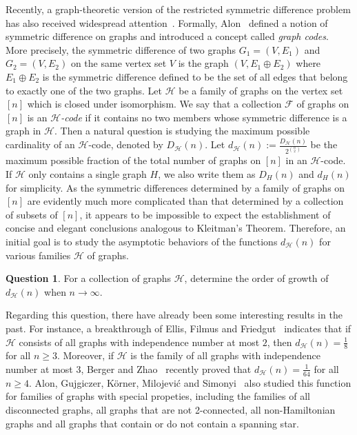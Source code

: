 \documentclass[11pt]{article}
\theoremstyle{definition}
\newtheorem{ques}[theorem]{Question}
\begin{document}
Recently, a graph-theoretic version of the restricted symmetric difference problem has also received widespread attention~\cite{2023AlonCodes,2023SIAMAlon}. Formally, Alon~\cite{2023AlonCodes} defined a notion of symmetric difference on graphs and introduced a concept called \emph{graph codes}. More precisely, the symmetric difference of two graphs $G_{1}=(V,E_{1})$ and $G_{2}=(V,E_{2})$ on the same vertex set $V$ is the graph $(V,E_{1}\oplus E_{2})$ where $E_{1}\oplus E_{2}$ is the symmetric difference defined to be the set of all edges that belong to exactly one of the two graphs. Let $\mathcal{H}$ be a family of graphs on the vertex set $[n]$ which is closed under isomorphism. We say that a collection $\mathcal{F}$ of graphs on $[n]$ is an \emph{$\mathcal{H}$-code} if
it contains no two members whose symmetric difference is a graph in $\mathcal{H}$. Then a natural question is studying the maximum possible cardinality of an $\mathcal{H}$-code, denoted by $D_{\mathcal{H}}(n)$. Let $d_{\mathcal{H}}(n):=\frac{D_{\mathcal{H}}(n)}{2^{\binom{n}{2}}}$ be the maximum possible fraction of the total number of graphs on $[n]$ in an $\mathcal{H}$-code. If $\mathcal{H}$ only contains a single graph $H$, we also write them as $D_{H}(n)$ and $d_{H}(n)$ for simplicity. As the symmetric differences determined by a family of graphs on $[n]$ are evidently much more complicated than that determined by a collection of subsets of $[n]$, it appears to be impossible to expect the establishment of concise and elegant conclusions analogous to Kleitman's Theorem. Therefore, an initial goal is to study the asymptotic behaviors of the functions $d_{\mathcal{H}}(n)$ for various families $\mathcal{H}$ of graphs.

\begin{ques}
    For a collection of graphs $\mathcal{H}$, determine the order of growth of $d_{\mathcal{H}}(n)$ when $n\rightarrow\infty$.
\end{ques}
Regarding this question, there have already been some interesting results in the past. For instance, a breakthrough of Ellis, Filmus and Friedgut~\cite{2012JEMSDavidEllis} indicates that if $\mathcal{H}$ consists of all graphs with independence number at most $2$, then $d_{\mathcal{H}}(n)=\frac{1}{8}$ for all $n\ge 3$. Moreover, if $\mathcal{H}$ is the family of all graphs with independence number at most $3$, Berger and Zhao~\cite{2021YufeiZhao} recently proved that $d_{\mathcal{H}}(n)=\frac{1}{64}$ for all $n\ge 4$. Alon, Gujgiczer, K\"{o}rner, Milojevi\'{c} and Simonyi~\cite{2023SIAMAlon} also studied this function for families of graphs with special propeties, including the families of all disconnected graphs, all graphs that are not 2-connected, all non-Hamiltonian graphs and all graphs that contain or do not contain a spanning star.
\end{document}
